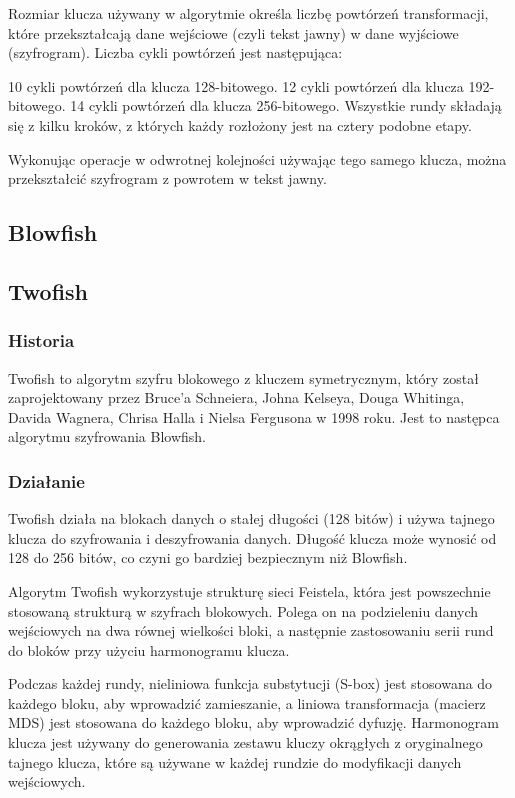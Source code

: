 Rozmiar klucza używany w algorytmie określa liczbę powtórzeń transformacji, które przekształcają dane wejściowe (czyli tekst jawny) w dane wyjściowe (szyfrogram). Liczba cykli powtórzeń jest następująca:

10 cykli powtórzeń dla klucza 128-bitowego.
12 cykli powtórzeń dla klucza 192-bitowego.
14 cykli powtórzeń dla klucza 256-bitowego.
Wszystkie rundy składają się z kilku kroków, z których każdy rozłożony jest na cztery podobne etapy.

Wykonując operacje w odwrotnej kolejności używając tego samego klucza, można przekształcić szyfrogram z powrotem w tekst jawny.
\subsection{Blowfish}

\subsection{Twofish}
\subsubsection{Historia}
Twofish to algorytm szyfru blokowego z kluczem symetrycznym, który został zaprojektowany przez Bruce'a Schneiera, Johna Kelseya, Douga Whitinga, Davida Wagnera, Chrisa Halla i Nielsa Fergusona w 1998 roku. Jest to następca algorytmu szyfrowania Blowfish.
\subsubsection{Działanie}
Twofish działa na blokach danych o stałej długości (128 bitów) i używa tajnego klucza do szyfrowania i deszyfrowania danych. Długość klucza może wynosić od 128 do 256 bitów, co czyni go bardziej bezpiecznym niż Blowfish.

Algorytm Twofish wykorzystuje strukturę sieci Feistela, która jest powszechnie stosowaną strukturą w szyfrach blokowych. Polega on na podzieleniu danych wejściowych na dwa równej wielkości bloki, a następnie zastosowaniu serii rund do bloków przy użyciu harmonogramu klucza.

Podczas każdej rundy, nieliniowa funkcja substytucji (S-box) jest stosowana do każdego bloku, aby wprowadzić zamieszanie, a liniowa transformacja (macierz MDS) jest stosowana do każdego bloku, aby wprowadzić dyfuzję. Harmonogram klucza jest używany do generowania zestawu kluczy okrągłych z oryginalnego tajnego klucza, które są używane w każdej rundzie do modyfikacji danych wejściowych.

